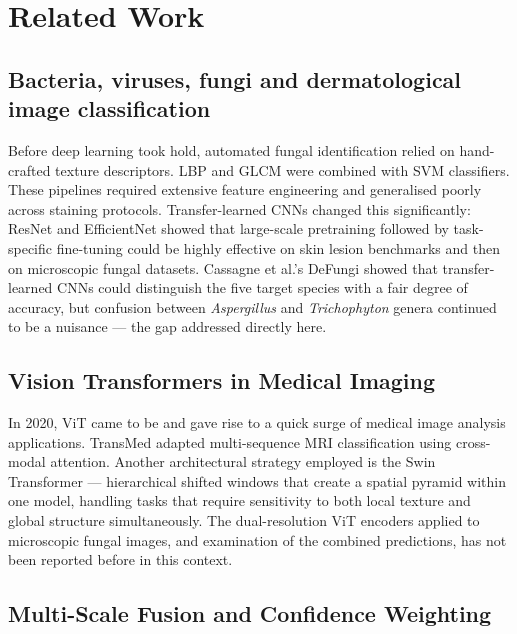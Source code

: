 \documentclass[conference]{IEEEtran}
\begin{document}
\vspace{-2pt}
\section{Related Work}

\subsection{Bacteria, viruses, fungi and dermatological image classification}

Before deep learning took hold, automated fungal identification relied on
hand-crafted texture descriptors. LBP and GLCM were combined with SVM
classifiers. These pipelines required extensive feature engineering and
generalised poorly across staining protocols. Transfer-learned CNNs changed
this significantly: ResNet \cite{he2016} and EfficientNet \cite{tan2019}
showed that large-scale pretraining followed by task-specific fine-tuning
could be highly effective on skin lesion benchmarks and then on microscopic
fungal datasets. Cassagne et al.'s DeFungi \cite{defungi2021} showed that
transfer-learned CNNs could distinguish the five target species with a fair
degree of accuracy, but confusion between \textit{Aspergillus} and
\textit{Trichophyton} genera continued to be a nuisance --- the gap addressed
directly here.

\subsection{Vision Transformers in Medical Imaging}

In 2020, ViT \cite{dosovitskiy2021} came to be and gave rise to a quick surge
of medical image analysis applications. TransMed \cite{dai2021} adapted
multi-sequence MRI classification using cross-modal attention. Another
architectural strategy employed is the Swin Transformer \cite{liu2021} ---
hierarchical shifted windows that create a spatial pyramid within one model,
handling tasks that require sensitivity to both local texture and global
structure simultaneously. The dual-resolution ViT encoders applied to
microscopic fungal images, and examination of the combined predictions, has
not been reported before in this context.

\subsection{Multi-Scale Fusion and Confidence Weighting}
\end{document}
